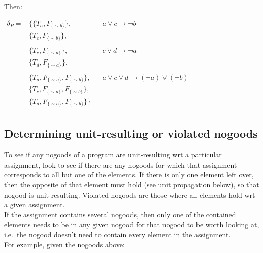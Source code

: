 \documentclass[9pt,a4paper,landscape]{article}
\newcommand{\ngfb}[1]{F_{ \{#1\} }}
\newcommand{\ngta}[1]{T_{#1}}
\begin{document}
{Then:
\begin{center}
	$\begin{array}{rlll}
	\delta_P = 	& \{ \{ \ngta{a}, \ngfb{\sim b} \}, && a \lor c \rightarrow \neg b \\
				& \{ \ngta{c}, \ngfb{\sim b} \}, && \\ &\\
				& \{ \ngta{c}, \ngfb{\sim a} \}, && c \lor d \rightarrow \neg a \\
				& \{ \ngta{d}, \ngfb{\sim a} \}, && \\ &\\
				& \{ \ngta{a}, \ngfb{\sim a}, \ngfb{\sim b} \}, && a \lor c \lor d \rightarrow (\neg a) \lor (\neg b) \\
				& \{ \ngta{c}, \ngfb{\sim a}, \ngfb{\sim b} \}, && \\			
				& \{ \ngta{d}, \ngfb{\sim a}, \ngfb{\sim b} \} \} && \\		
	\end{array}$
\end{center}


\subsection{Determining unit-resulting or violated nogoods}
\label{subsec:ng-viol}

To see if any nogoods of a program are unit-resulting wrt a particular assignment, look to see if there are any nogoods for which that assignment corresponds to all but one of the elements.
If there is only one element left over, then the opposite of that element must hold (see unit propagation below), so that nogood is unit-resulting.
Violated nogoods are those where all elements hold wrt a given assignment.\\

If the assignment contains several nogoods, then only one of the contained elements needs to be in any given nogood for that nogood to be worth looking at, i.e.\ the nogood doesn't need to contain every element in the assignment.\\

For example, given the nogoods above:

}
\end{document}
